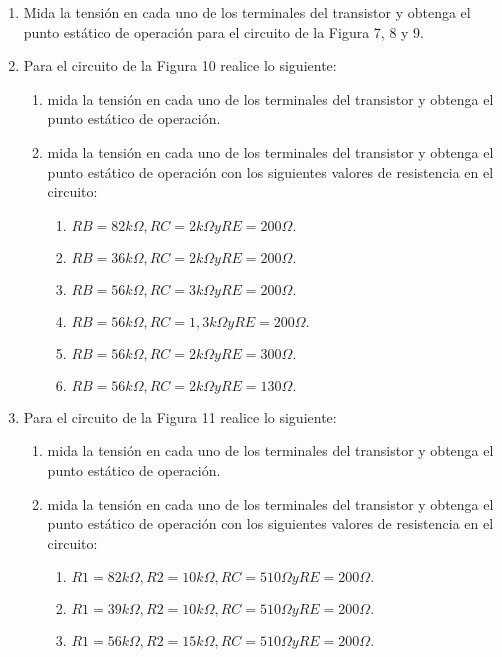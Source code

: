\documentclass[10pt, a4paper]{article}
\begin{document}
    \begin{enumerate}
        \item Mida la tensión en cada uno de los terminales del transistor y obtenga el punto estático de operación para el circuito de la Figura 7, 8 y 9.
        \item Para el circuito de la Figura 10 realice lo siguiente:
        \begin{enumerate}
            \item mida la tensión en cada uno de los terminales del transistor y obtenga el punto estático de operación.
            \item mida la tensión en cada uno de los terminales del transistor y obtenga el punto estático de operación con los siguientes valores de resistencia en el circuito:
            \begin{enumerate}
                \item $RB=82k\Omega, RC=2k\Omega y RE=200\Omega.$
                \item $RB=36k\Omega, RC=2k\Omega y RE=200\Omega.$
                \item $RB=56k\Omega, RC=3k\Omega y RE=200\Omega.$
                \item $RB=56k\Omega, RC=1,3k\Omega y RE=200\Omega.$ 
                \item $RB=56k\Omega, RC=2k\Omega y RE=300\Omega.$
                \item $RB=56k\Omega, RC=2k\Omega y RE=130\Omega.$
            \end{enumerate}
        \end{enumerate}
        \item Para el circuito de la Figura 11 realice lo siguiente:
        \begin{enumerate}
            \item mida la tensión en cada uno de los terminales del transistor y obtenga el punto estático de operación.
            \item mida la tensión en cada uno de los terminales del transistor y obtenga el punto estático de operación con los siguientes valores de resistencia en el circuito:
            \begin{enumerate}
                \item $R1=82k\Omega, R2=10k\Omega, RC=510\Omega y RE=200\Omega.$
                \item $R1=39k\Omega, R2=10k\Omega, RC=510\Omega y RE=200\Omega.$
                \item $R1=56k\Omega, R2=15k\Omega, RC=510\Omega y RE=200\Omega.$

\end{enumerate}
\end{enumerate}
\end{enumerate}
\end{document}
